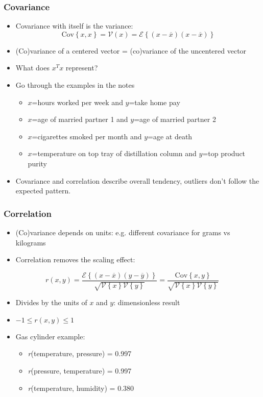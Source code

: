 \begin{frame}\frametitle{Covariance}
	\begin{itemize}
		\item	Covariance with itself is the variance:
		$$\text{Cov}\left\{x, x\right\} = \mathcal{V}(x) = \mathcal{E}\left\{ (x - \overline{x}) (x - \overline{x})\right\}$$

		\item	(Co)variance of a centered vector = (co)variance of the uncentered vector
		\item	What does $x^Tx$ represent?
	\end{itemize}
	\begin{itemize}
		\item	Go through the examples in the notes
		\begin{itemize}
			\item	$x$=hours worked per week and $y$=take home pay
			\item	$x$=age of married partner 1 and $y$=age of married partner 2
			\item	$x$=cigarettes smoked per month and $y$=age at death
			\item	$x$=temperature on top tray of distillation column and $y$=top product purity
		\end{itemize}
	\end{itemize}
	\begin{itemize}
		\item	Covariance and correlation describe overall tendency, outliers don't follow the expected pattern.
	\end{itemize}
\end{frame}

\begin{frame}\frametitle{Correlation}
	\begin{itemize}
		\item	(Co)variance depends on units: e.g. different covariance for grams vs kilograms
		\item	Correlation removes the scaling effect:
	\end{itemize}

	$$r(x, y) = \dfrac{\mathcal{E}\left\{ (x - \overline{x}) (y - \overline{y})\right\}}{\sqrt{\mathcal{V}\left\{x\right\}\mathcal{V}\left\{y\right\}}} = \dfrac{\text{Cov}\left\{x, y\right\}}{\sqrt{\mathcal{V}\left\{x\right\}\mathcal{V}\left\{y\right\}}}$$
	\begin{itemize}
		\item	Divides by the units of $x$ and $y$: dimensionless result
		\item	$-1 \leq r(x,y) \leq 1$
	\end{itemize}
	\begin{itemize}
		\item	Gas cylinder example:
		\begin{itemize}
			\item	\emph{r}(temperature, pressure) = 0.997
			\item	\emph{r}(pressure, temperature) = 0.997
			\item	\emph{r}(temperature, humidity) = 0.380
		\end{itemize}
	\end{itemize}
\end{frame}

